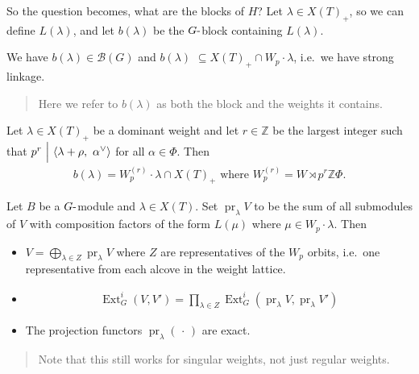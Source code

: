 So the question becomes, what are the blocks of \(H\)? Let
\(\lambda \in X(T)_+\), so we can define \(L(\lambda)\), and let
\(b(\lambda)\) be the \(G{\hbox{-}}\)block containing \(L(\lambda)\).

We have \(b(\lambda) \in \mathcal{B}(G)\) and \(b(\lambda)\)
\(\subseteq X(T)_+ \cap W_p \cdot \lambda\), i.e.~we have strong
linkage.

\begin{quote}
Here we refer to \(b(\lambda)\) as both the block and the weights it
contains.
\end{quote}

\begin{theorem}[Donkin]

\begin{theorem}[Donkin]

Let \(\lambda \in X(T)_+\) be a dominant weight and let
\(r\in {\mathbb{Z}}\) be the largest integer such that
\(p^r {~\Bigm|~}{\left\langle { \lambda + \rho},~{\alpha^\vee} \right\rangle}\)
for all \(\alpha\in \Phi\). Then
\begin{align*} b(\lambda) = W_p^{(r)} \cdot \lambda \cap X(T)_+ \text{ where } W_p^{(r)} = W\rtimes p^r {\mathbb{Z}}\Phi .\end{align*}

\end{theorem}

\end{theorem}

\begin{proposition}[?]

\begin{proposition}[?]

Let \(B\) be a \(G{\hbox{-}}\)module and \(\lambda \in X(T)\). Set
\({\operatorname{pr}}_\lambda V\) to be the sum of all submodules of
\(V\) with composition factors of the form \(L(\mu)\) where
\(\mu \in W_p \cdot \lambda\). Then

\begin{itemize}
\item
  \(V = \bigoplus_{\lambda \in Z} {\operatorname{pr}}_\lambda V\) where
  \(Z\) are representatives of the \(W_p\) orbits, i.e.~one
  representative from each alcove in the weight lattice.
\item
  \begin{align*} \operatorname{Ext}_G^i(V, V') = \prod_{\lambda \in Z} \operatorname{Ext}_G^i ({\operatorname{pr}}_\lambda V, {\operatorname{pr}}_\lambda V') \end{align*}
\item
  The projection functors \({\operatorname{pr}}_\lambda({\,\cdot\,})\)
  are exact.
\end{itemize}

\begin{quote}
Note that this still works for singular weights, not just regular
weights.
\end{quote}

\end{proposition}

\end{proposition}


